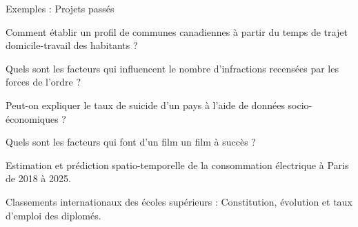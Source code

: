 \documentclass{beamer}
\begin{document}
\begin{frame}{Exemples : Projets passés}
\begin{small}
Comment établir un profil de communes canadiennes à partir du temps de trajet domicile-travail des habitants ? 



Quels sont les facteurs qui influencent le nombre d’infractions recensées par les forces de l’ordre ?

Peut-on expliquer le taux de suicide d'un pays à l'aide de données socio-économiques ? 

Quels sont les facteurs qui font d'un film un film à succès ? 

Estimation et prédiction spatio-temporelle de la consommation électrique à Paris
de 2018 à 2025.


Classements internationaux  des écoles supérieurs : Constitution, évolution et taux d’emploi des diplomés.
\end{small}

\end{frame}

\end{document}
